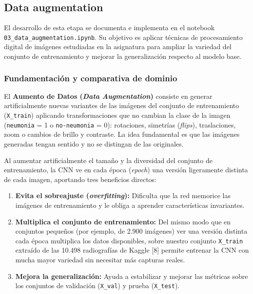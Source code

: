 \documentclass[11pt, a4paper]{article}
\numberwithin{equation}{section}
\begin{document}
\subsection{Data augmentation}

El desarrollo de esta etapa se documenta e implementa en el notebook \texttt{03\_data\_augmentation.ipynb}. Su objetivo es aplicar técnicas de procesamiento digital de imágenes estudiadas en la asignatura para ampliar la variedad del conjunto de entrenamiento y mejorar la generalización respecto al modelo base.

\subsubsection{Fundamentación y comparativa de dominio}
El \textbf{Aumento de Datos (\textit{Data Augmentation})} consiste en generar artificialmente nuevas variantes de las imágenes del conjunto de entrenamiento (\texttt{X\_train}) aplicando transformaciones que no cambian la clase de la imagen (\texttt{neumonia} = 1 o \texttt{no-neumonia} = 0): rotaciones, simetrías (\textit{flips}), traslaciones, zoom o cambios de brillo y contraste. La idea fundamental es que las imágenes generadas tengan sentido y no se distingan de las originales.

Al aumentar artificialmente el tamaño y la diversidad del conjunto de entrenamiento, la CNN ve en cada época (\textit{epoch}) una versión ligeramente distinta de cada imagen, aportando tres beneficios directos:
\begin{enumerate}
    \item \textbf{Evita el sobreajuste (\textit{overfitting}):} Dificulta que la red memorice las imágenes de entrenamiento y le obliga a aprender características invariantes.
    \item \textbf{Multiplica el conjunto de entrenamiento:} Del mismo modo que en conjuntos pequeños (por ejemplo, de 2.900 imágenes) ver una versión distinta cada época multiplica los datos disponibles, sobre nuestro conjunto \texttt{X\_train} extraído de las 10.498 radiografías de Kaggle [8] permite entrenar la CNN con mucha mayor variedad sin necesitar más capturas reales.
    \item \textbf{Mejora la generalización:} Ayuda a estabilizar y mejorar las métricas sobre los conjuntos de validación (\texttt{X\_val}) y prueba (\texttt{X\_test}).
\end{enumerate}
\end{document}
